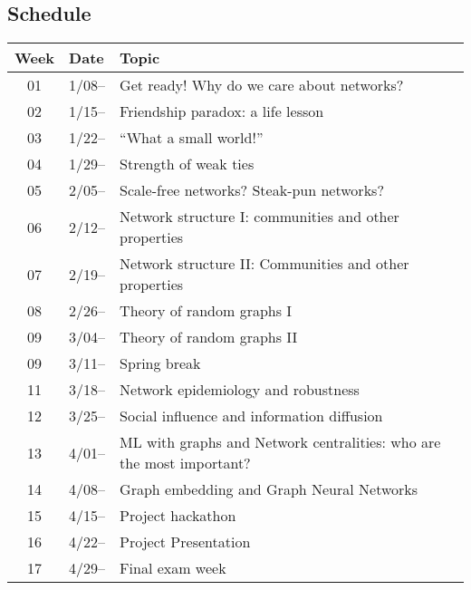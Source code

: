 \subsection{Schedule}\label{sub:schedule}%

\begin{tabular}{@{}cll@{}} \toprule
  Week & Date & Topic \\\midrule
  01 & 1/08-- & Get ready! Why do we care about networks? \\
  02 & 1/15-- & Friendship paradox: a life lesson \\
  03 & 1/22-- & ``What a small world!'' \\
  04 & 1/29-- & Strength of weak ties \\
  05 & 2/05-- & Scale-free networks? Steak-pun networks? \\
  06 & 2/12-- & Network structure I: communities and other properties  \\
  07 & 2/19-- & Network structure II: Communities and other properties  \\
  08 & 2/26-- & Theory of random graphs I \\
  09 & 3/04-- & Theory of random graphs II \\
  09 & 3/11-- & Spring break \\
  11 & 3/18-- & Network epidemiology and robustness \\
  12 & 3/25-- & Social influence and information diffusion \\
  13 & 4/01-- & ML with graphs and Network centralities: who are the most important? \\
  14 & 4/08-- & Graph embedding and Graph Neural Networks \\
  15 & 4/15-- & Project hackathon \\
  16 & 4/22-- & Project Presentation \\
  17 & 4/29-- & Final exam week \\
  \bottomrule
\end{tabular}


